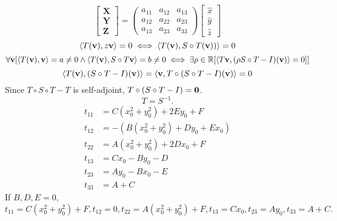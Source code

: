 \documentclass{article}
\begin{document}
	$$\begin{bmatrix}
		\mathbf{X}\\
		\mathbf{Y}\\
		\mathbf{Z}
 	\end{bmatrix}
	=
	\begin{pmatrix}
		a_{11} & a_{12} & a_{13}\\
		a_{12} & a_{22} & a_{23}\\
		a_{13} & a_{23} & a_{33}
 	\end{pmatrix}
	\begin{bmatrix}
		\hat x\\
		\hat y\\
		\hat z
 	\end{bmatrix}$$
	$$\left<T({\bf v}),z{\bf v}\right>=0\iff \left<T({\bf v}),S\circ T({\bf v}))\right>=0$$
	$$\forall{\bf v}[\left<T({\bf v}),{\bf v}\right>=a\ne0\wedge\left<T({\bf v}),S\circ T{\bf v}\right>=b\ne0\iff\exists\rho\in\mathbb{R}[\left<T{\bf v},(\rho S\circ T-I)(\bf v)\right>=0]]$$
	$$\left<T({\bf v}),(S\circ T-I)({\bf v})\right>=\left<{\bf v},T\circ(S\circ T-I)(\bf v)\right>=0$$
Since $T\circ S\circ T-T$ is self-adjoint, $T\circ(S\circ T-I)={\bf0}$.
$$T=S^{-1}.$$
\begin{align}
t_{11}&=C(x_0^2+y_0^2)+2Ey_0+F\\
t_{12}&=-(B(x_0^2+y_0^2)+Dy_0+Ex_0)\\
t_{22}&=A(x_0^2+y_0^2)+2Dx_0+F\\
t_{13}&=Cx_0-By_0-D\\
t_{23}&=Ay_0-Bx_0-E\\
t_{33}&=A+C
\end{align}
If $B,D,E=0$, $t_{11}=C(x_0^2+y_0^2)+F,t_{12}=0,t_{22}=A(x_0^2+y_0^2)+F,t_{13}=Cx_0,t_{23}=Ay_0,t_{33}=A+C.$
\end{document}
